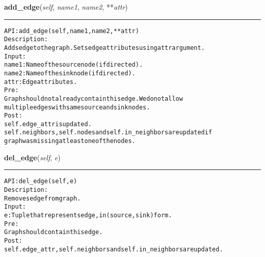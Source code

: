     \label{coinor:gimpy:graph:Graph:add_edge}

    \vspace{0.5ex}

\hspace{.8\funcindent}\begin{boxedminipage}{\funcwidth}

    \raggedright \textbf{add\_edge}(\textit{self}, \textit{name1}, \textit{name2}, **\textit{attr})

    \vspace{-1.5ex}

    \rule{\textwidth}{0.5\fboxrule}
\setlength{\parskip}{2ex}
\begin{alltt}

API: add\_edge(self, name1, name2, **attr)
Description:
Adds edge to the graph. Sets edge attributes using attr argument.
Input:
    name1: Name of the source node (if directed).
    name2: Name of the sink node (if directed).
    attr: Edge attributes.
Pre:
    Graph should not already contain this edge. We do not allow
    multiple edges with same source and sink nodes.
Post:
    self.edge\_attr is updated.
    self.neighbors, self.nodes and self.in\_neighbors are updated if
    graph was missing at least one of the nodes.
\end{alltt}

\setlength{\parskip}{1ex}
    \end{boxedminipage}

    \label{coinor:gimpy:graph:Graph:del_edge}

    \vspace{0.5ex}

\hspace{.8\funcindent}\begin{boxedminipage}{\funcwidth}

    \raggedright \textbf{del\_edge}(\textit{self}, \textit{e})

    \vspace{-1.5ex}

    \rule{\textwidth}{0.5\fboxrule}
\setlength{\parskip}{2ex}
\begin{alltt}

API: del\_edge(self, e)
Description:
Removes edge from graph.
Input:
    e: Tuple that represents edge, in (source,sink) form.
Pre:
    Graph should contain this edge.
Post:
    self.edge\_attr, self.neighbors and self.in\_neighbors are updated.
\end{alltt}

\setlength{\parskip}{1ex}
    \end{boxedminipage}

